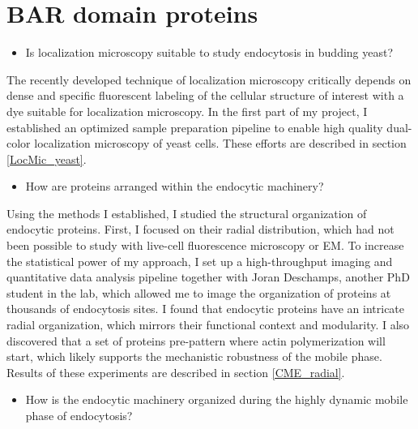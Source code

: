 	\section{BAR domain proteins}
		
		
		
		
	
\begin{itemize}
	\item Is localization microscopy suitable to study endocytosis in budding yeast?
\end{itemize}

The recently developed technique of localization microscopy critically depends on dense and specific fluorescent labeling of the cellular structure of interest with a dye suitable for localization microscopy. In the first part of my project, I established an optimized sample preparation pipeline to enable high quality dual-color localization microscopy of yeast cells. These efforts are described in section \ref{LocMic_yeast}.

\begin{itemize}
	\item How are proteins arranged within the endocytic machinery?
\end{itemize}

Using the methods I established, I studied the structural organization of endocytic proteins. First, I focused on their radial distribution, which had not been possible to study with live-cell fluorescence microscopy or EM. To increase the statistical power of my approach, I set up a high-throughput imaging and quantitative data analysis pipeline together with Joran Deschamps, another PhD student in the lab, which allowed me to image the organization of proteins at thousands of endocytosis sites. I found that endocytic proteins have an intricate radial organization, which mirrors their functional context and modularity. I also discovered that a set of proteins pre-pattern where actin polymerization will start, which likely supports the mechanistic robustness of the mobile phase. Results of these experiments are described in section \ref{CME_radial}.

\begin{itemize}
	\item How is the endocytic machinery organized during the highly dynamic mobile phase of endocytosis?
\end{itemize}

